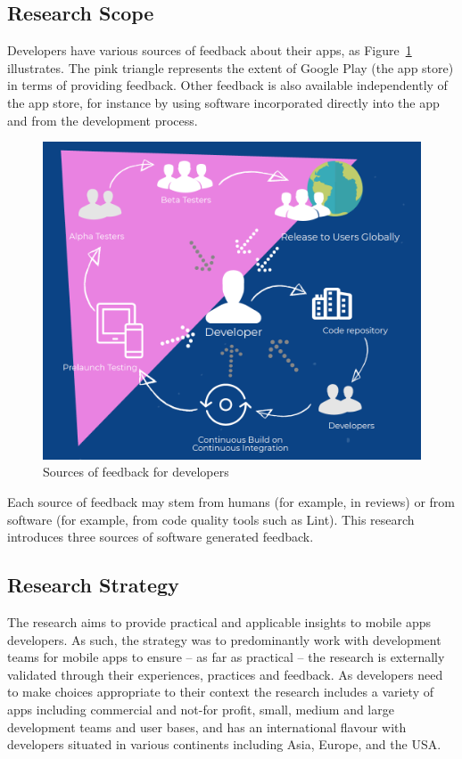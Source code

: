 \subsection{Research Scope}
Developers have various sources of feedback about their apps, as Figure~\ref{fig:sources-of-feedback-for-developers} illustrates. The pink triangle represents the extent of Google Play (the app store) in terms of providing feedback. Other feedback is also available independently of the app store, for instance by using software incorporated directly into the app and from the development process.

\begin{figure}[htbp!]
    \centering
    \includegraphics[width=13cm]{images/silvias-developer-centric-figure-mobilesoft2020.png}
    \caption{Sources of feedback for developers}
    \label{fig:sources-of-feedback-for-developers}
\end{figure}

Each source of feedback may stem from humans (for example, in reviews) or from software (for example, from code quality tools such as Lint). This research introduces three sources of software generated feedback.

\subsection{Research Strategy}
The research aims to provide practical and applicable insights to mobile apps developers. As such, the strategy was to predominantly work with development teams for mobile apps to ensure -- as far as practical -- the research is externally validated through their experiences, practices and feedback. As developers need to make choices appropriate to their context the research includes a variety of apps including commercial and not-for profit, small, medium and large development teams and user bases, and has an international flavour with developers situated in various continents including Asia, Europe, and the USA.

